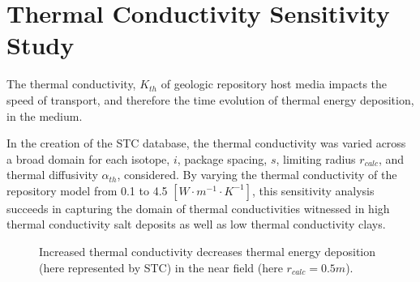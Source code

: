 \section{Thermal Conductivity Sensitivity Study}\label{sec:conductivity}
The thermal conductivity, $K_{th}$ of geologic repository host media impacts 
the speed of transport, and therefore the time evolution of thermal energy 
deposition, in the medium. 

In the creation of the \gls{STC} database, the thermal conductivity was varied 
across a broad domain for each isotope, $i$, package spacing, $s$, limiting 
radius $r_{calc}$, and thermal diffusivity $\alpha_{th}$, considered.  By 
varying the thermal conductivity of the repository model from 0.1 to 4.5
$[W\cdot m^{-1} \cdot K^{-1}]$, this sensitivity analysis succeeds in capturing the domain of 
thermal conductivities witnessed in high thermal conductivity salt deposits as 
well as low thermal conductivity clays.

\begin{figure}[htbp!]
\begin{center}
\end{center}
\caption[$K_{th}$ Sensitivity for Low $\alpha_{th}$]{Increased thermal conductivity decreases thermal energy deposition 
(here represented by \gls{STC}) in the near field (here $r_{calc} = 0.5m$).}
\label{fig:Cm242Kth_alpha_low}
\end{figure}
